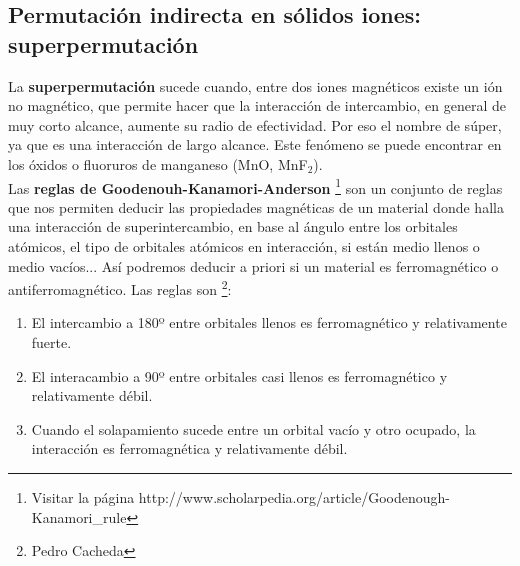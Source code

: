 \documentclass[12pt,a4paper]{book}
\numberwithin{equation}{section}
\numberwithin{figure}{section}
\begin{document}
\subsection{Permutación indirecta en sólidos iones: superpermutación}

La \textbf{superpermutación} sucede cuando, entre dos iones magnéticos existe un ión no magnético, que permite hacer que la interacción de intercambio, en general de muy corto alcance, aumente su radio de efectividad. Por eso el nombre de súper, ya que es una interacción de largo alcance. Este fenómeno se puede encontrar en los óxidos o fluoruros de manganeso (MnO, MnF$_2$).  \\

Las \textbf{reglas de Goodenouh-Kanamori-Anderson} \footnote{Visitar la página http://www.scholarpedia.org/article/Goodenough-Kanamori\_rule} son un conjunto de reglas que nos permiten deducir las propiedades magnéticas de un material donde halla una interacción de superintercambio, en base al ángulo entre los orbitales atómicos, el tipo de orbitales atómicos en interacción, si están medio llenos o medio vacíos... Así podremos deducir a priori si un material es ferromagnético o antiferromagnético. Las reglas son \footnote{Pedro Cacheda}:

\begin{enumerate}
    \item El intercambio a 180º entre orbitales llenos es ferromagnético y relativamente fuerte.
    \item El interacambio a 90º entre orbitales casi llenos es ferromagnético y relativamente débil. 
    \item Cuando el solapamiento sucede entre un orbital vacío y otro ocupado, la interacción es ferromagnética y relativamente débil. 
\end{enumerate}



\end{document}

